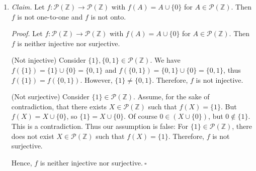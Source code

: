 \documentclass{article}
\newcommand{\Z}{\mathbb{Z}}
\newcommand{\N}{\mathbb{N}}
\theoremstyle{definition}
\begin{document}
\begin{solution}
\begin{enumerate}
(Not surjective) Consider $6\in\N$. Assume, for the sake of contradiction, there exists $x\in\N$ such that $f(x)=6$. Then $x$ is even or $x$ is odd.

Suppose $x$ is odd. Then $f(x)=x=6$. Then there exists $k_1\in\Z$ such that $x=2k_1-1$. So $2k_1=7$, so $k_1=\frac{7}{2}$. But $k_1$ is an integer. This is a contradiction.

Suppose $x$ is even. Then there exists $k_2\in\Z$ such that $x=2k_2$. So $f(2k_2)=2^{2k_2}$. Thus $6=4^{k_2}$, so $k_2=\log_4{6}$. Note $3<k_2<4$. But $k_2$ is an integer. This is a contradiction.

In all cases, we arrive at a contradiction. Thus our assumption is false: For $6\in\N$, there does not exist $x\in\N$ such that $f(x)=6$. Therefore, $f$ is not surjective.\newline

Hence, $f$ is neither injective nor surjective.$~\square$
\item\textit{Claim. }Let $f:\mathcal{P}(\Z)\to\mathcal{P}(\Z)$ with $f(A)=A\cup\{0\}$ for $A\in\mathcal{P}(\Z)$. Then $f$ is not one-to-one and $f$ is not onto.\newline

\textit{Proof. }Let $f:\mathcal{P}(\Z)\to\mathcal{P}(\Z)$ with $f(A)=A\cup\{0\}$ for $A\in\mathcal{P}(\Z)$. Then $f$ is neither injective nor surjective.\newline

(Not injective) Consider $\{1\},\{0,1\}\in\mathcal{P}(\Z)$. We have $f(\{1\})=\{1\}\cup\{0\}=\{0,1\}$ and $f(\{0,1\})=\{0,1\}\cup\{0\}=\{0,1\}$, thus $f(\{1\})=f(\{0,1\})$. However, $\{1\}\neq\{0,1\}$. Therefore, $f$ is not injective.\newline

(Not surjective) Consider $\{1\}\in\mathcal{P}(\Z)$. Assume, for the sake of contradiction, that there exists $X\in\mathcal{P}(\Z)$ such that $f(X)=\{1\}$. But $f(X)=X\cup\{0\}$, so $\{1\}=X\cup\{0\}$. Of course $0\in(X\cup\{0\})$, but $0\notin\{1\}$. This is a contradiction. Thus our assumption is false: For $\{1\}\in\mathcal{P}(\Z)$, there does not exist $X\in\mathcal{P}(\Z)$ such that $f(X)=\{1\}$. Therefore, $f$ is not surjective.\newline

Hence, $f$ is neither injective nor surjective.$~\square$
\end{enumerate}
\end{solution}
\end{document}

